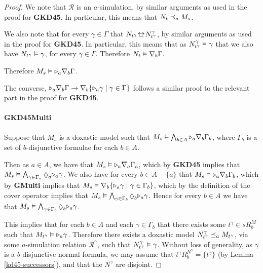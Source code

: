 \begin{proof}
We note that $\mathcal{R}$ is an $a$-simulation, by similar arguments as used in
the proof for {\bf GKD45}. In particular, this means that $N_t \preceq_a
M_s$.

We also note that for every $\gamma \in \Gamma$ that $N_{t^\gamma} \bisim
N^\gamma_{t^\gamma}$, by similar arguments as used in the proof for {\bf GKD45}.
In particular, this means that as $N^\gamma_{t^\gamma} \vDash \gamma$ that we
also have $N_{t^\gamma} \vDash \gamma$, for every $\gamma \in \Gamma$.
Therefore $N_t \vDash \nabla_b \Gamma$.

Therefore $M_s \vDash {\ensuremath{\mathopen{\triangleright}}}_a \nabla_b \Gamma$.

The converse, ${\mathopen{\triangleright}}_a \nabla_b \Gamma \rightarrow \nabla_b \{{\mathopen{\triangleright}}_a
\gamma \mid \gamma \in \Gamma\}$ follows a similar proof to the relevant part in
the proof for {\bf GKD45}.

\paragraph{GKD45Multi} Suppose that $M_s$ is a doxastic model such that $M_s
\vDash \bigwedge_{b \in A} {\mathopen{\triangleright}}_a \nabla_b \Gamma_b$, where $\Gamma_b$
is a set of $b$-disjunctive formulae for each $b \in A$.

Then as $a \in A$, we have that $M_s \vDash {\ensuremath{\mathopen{\triangleright}}}_a \nabla_a \Gamma_a$,
which by {\bf GKD45} implies that $M_s \entails \bigwedge_{\gamma \in
\Gamma_a} \suspects_a \somerefs_a \gamma$. We also have for every $b \in A -
\{a\}$ that $M_s \vDash {\ensuremath{\mathopen{\triangleright}}}_a \nabla_b \Gamma_b$, which by {\bf GMulti}
implies that $M_s \vDash \nabla_b \{{\mathopen{\triangleright}}_a \gamma \mid \gamma \in
\Gamma_b\}$, which by the definition of the cover operator implies that $M_s
\entails \bigwedge_{\gamma \in \Gamma_b} \suspects_b \somerefs_a \gamma$.
Hence for every $b \in A$ we have that $M_s \entails \bigwedge_{\gamma \in
\Gamma_b} \suspects_b \somerefs_a \gamma$.

This implies that for each $b \in A$ and each $\gamma \in \Gamma_b$ that there
exists some $t^{\gamma} \in sR^M_b$ such that $M_{t^\gamma} \vDash {\ensuremath{\mathopen{\triangleright}}}_a
\gamma$. Therefore there exists a doxastic model $N^\gamma_{t^\gamma}
\preceq_a M_{t^\gamma}$, via some $a$-simulation relation
$\mathcal{R}^\gamma$, such that $N^\gamma_{t^\gamma} \vDash \gamma$.  Without
loss of generality, as $\gamma$ is a $b$-disjunctive normal formula, we may
assume that $t^\gamma R^{N^\gamma}_b = \{t^\gamma\}$ (by Lemma
\ref{kd45-successors}), and that the $N^\gamma$ are disjoint.


\end{proof}
